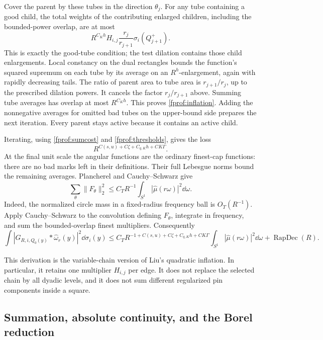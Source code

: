 Cover the parent by these tubes in the direction \(\theta_j\). For any tube containing a good child, the total weights of the contributing enlarged children, including the bounded-power overlap, are at most
$$
 R^{C_Kh}H_{i,j}\frac{r_j}{r_{j+1}}\sigma_i(Q_{j+1}^+).
$$
This is exactly the good-tube condition; the test dilation contains those child enlargements. Local constancy on the dual rectangles bounds the function's squared supremum on each tube by its average on an \(R^h\)-enlargement, again with rapidly decreasing tails. The ratio of parent area to tube area is \(r_{j+1}/r_j\), up to the prescribed dilation powers. It cancels the factor \(r_j/r_{j+1}\) above. Summing tube averages has overlap at most \(R^{C_Kh}\). This proves \eqref{fprof:inflation}. Adding the nonnegative averages for omitted bad tubes on the upper-bound side prepares the next iteration. Every parent stays active because it contains an active child.

Iterating, using \eqref{fprof:sumcost} and \eqref{fprof:thresholds}, gives the loss
$$
 R^{C(s,u)+C\zeta+C_{q,K}h+C K\Gamma}.
$$
At the final unit scale the angular functions are the ordinary finest-cap functions: there are no bad marks left in their definitions. Their full Lebesgue norms bound the remaining averages. Plancherel and Cauchy--Schwarz give
\begin{equation}\label{fprof:circleCS}
 \sum_\theta\|F_\theta\|_2^2
 \leq C_T R^{-1}\int_{S^1}|\widehat\mu(r\omega)|^2\dd\omega.
\end{equation}
Indeed, the normalized circle mass in a fixed-radius frequency ball is \(O_T(R^{-1})\). Apply Cauchy--Schwarz to the convolution defining \(F_\theta\), integrate in frequency, and sum the bounded-overlap finest multipliers. Consequently
\begin{equation}\label{fprof:circleestimate}
 \int|G_{R,i,Q_0(y)}*\widehat\omega_r(y)|^2\dd\sigma_i(y)
 \leq C_T R^{-1+C(s,u)+C\zeta+C_{q,K}h+C K\Gamma}
       \int_{S^1}|\widehat\mu(r\omega)|^2\dd\omega
       +\operatorname{RapDec}(R).
\end{equation}

This derivation is the variable-chain version of Liu's quadratic inflation. In particular, it retains one multiplier \(H_{i,j}\) per edge. It does not replace the selected chain by all dyadic levels, and it does not sum different regularized pin components inside a square.

\subsection{Summation, absolute continuity, and the Borel reduction}

